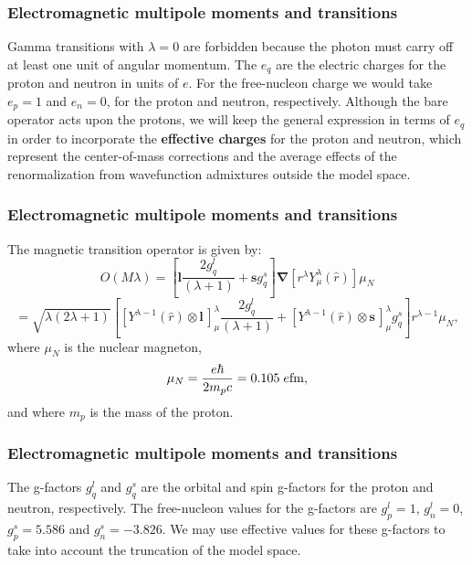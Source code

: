 \documentclass{beamer}
\begin{document}
\begin{frame}
\frametitle{Electromagnetic multipole moments and transitions}

\begin{block}{}
Gamma transitions
with $\lambda=0$ are forbidden because the photon must carry off
at least one unit of angular momentum. The $e_{q}$
are the electric charges for the proton and neutron in units of $  e  $.
For the free-nucleon
charge we would take $e_{p}=1$ and $e_{n}=0$, for the
proton and neutron, respectively.
Although the bare operator acts upon the protons,
we will keep the general expression in terms of $e_{q}$ in order
to incorporate the \textbf{effective charges} for the proton and
neutron, which represent the center-of-mass corrections and the
average effects of the renormalization from wavefunction
admixtures outside the model space.
\end{block}
\end{frame}

\begin{frame}
\frametitle{Electromagnetic multipole moments and transitions}

\begin{block}{}
The magnetic transition operator is given by:
\[
O(M\lambda)=\left[\mathbf{l}\frac{2g^{l }_{q}}{(\lambda +1)}+ \mathbf{s}g^{s}_{q}\right]\mathbf{\nabla}[r^{\lambda }Y^{\lambda }_{\mu }(\hat{r})]\mu _{N}
\]
\[
= \sqrt{\lambda (2\lambda +1)}\left[[Y^{\lambda -1}(\hat{r})\otimes \mathbf{l}\,]^{\lambda }_{\mu }\frac{2g^{l}_{q}}{(\lambda +1)}
+ [Y^{\lambda -1}(\hat{r})\otimes \mathbf{s}\,]^{\lambda }_{\mu }g^{s}_{q}\right]r^{\lambda -1}\mu _{N}, 
\]
 where $\mu_{N}$ is the nuclear magneton,
\[
\mu _{N}=\frac{e\hbar }{2m_{p}c} = 0.105 \; e {\rm fm}, 
\]
and where $m_{p}$ is the mass of the proton.
\end{block}
\end{frame}

\begin{frame}
\frametitle{Electromagnetic multipole moments and transitions}

\begin{block}{}
The g-factors $g^{l}_{q}$ and $g^{s}_{q}$
are the orbital and spin g-factors
for the proton and neutron, respectively.
The
free-nucleon values for the g-factors are $g^{l}_{p}=1$, $g^{l}_{n}=0$,
$g^{s}_{p}=5.586$ and $g^{s}_{n}=-3.826$. We may use effective values
for these g-factors to take into account the truncation of the model
space.

\end{block}
\end{frame}
\end{document}

